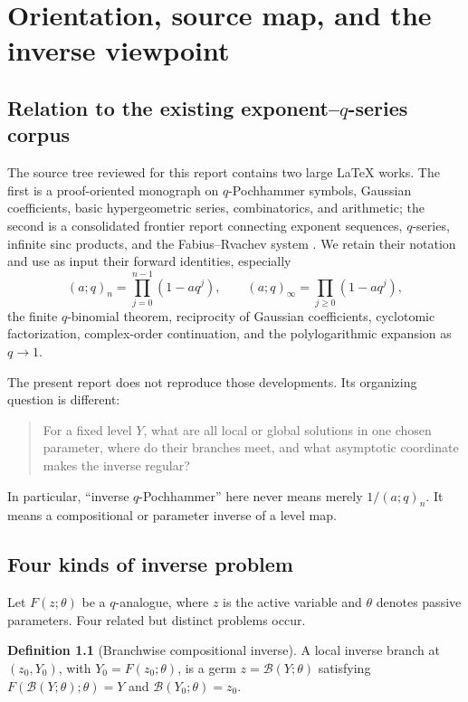 \documentclass[11pt,a4paper,oneside,openany]{book}
\theoremstyle{definition}
\newtheorem{definition}[theorem]{Definition}
\theoremstyle{remark}
\newcommand{\branch}{\mathscr B}
\begin{document}
\tableofcontents

\mainmatter

\chapter{Orientation, source map, and the inverse viewpoint}

\section{Relation to the existing exponent--\texorpdfstring{$q$}{q}-series corpus}

The source tree reviewed for this report contains two large LaTeX works.  The
first is a proof-oriented monograph on \(q\)-Pochhammer symbols, Gaussian
coefficients, basic hypergeometric series, combinatorics, and arithmetic; the
second is a consolidated frontier report connecting exponent sequences,
\(q\)-series, infinite sinc products, and the Fabius--Rvachev system
\cite{ProveItMonograph,ProveItFrontiers}.  We retain their notation and use
as input their forward identities, especially
\[
 (a;q)_n=\prod_{j=0}^{n-1}(1-aq^j),\qquad
 (a;q)_\infty=\prod_{j\ge0}(1-aq^j),
\]
the finite \(q\)-binomial theorem, reciprocity of Gaussian coefficients,
cyclotomic factorization, complex-order continuation, and the
polylogarithmic expansion as \(q\to1\).

The present report does not reproduce those developments.  Its organizing
question is different:
\begin{quote}
For a fixed level \(Y\), what are all local or global solutions in one chosen
parameter, where do their branches meet, and what asymptotic coordinate makes
the inverse regular?
\end{quote}
In particular, ``inverse \(q\)-Pochhammer'' here never means merely
\(1/(a;q)_n\).  It means a compositional or parameter inverse of a level map.

\section{Four kinds of inverse problem}

Let \(F(z;\theta)\) be a \(q\)-analogue, where \(z\) is the active variable
and \(\theta\) denotes passive parameters.  Four related but distinct
problems occur.

\begin{definition}[Branchwise compositional inverse]
A local inverse branch at \((z_0,Y_0)\), with \(Y_0=F(z_0;\theta)\), is a
germ \(z=\branch(Y;\theta)\) satisfying
\(F(\branch(Y;\theta);\theta)=Y\) and \(\branch(Y_0;\theta)=z_0\).
\end{definition}
\end{document}
